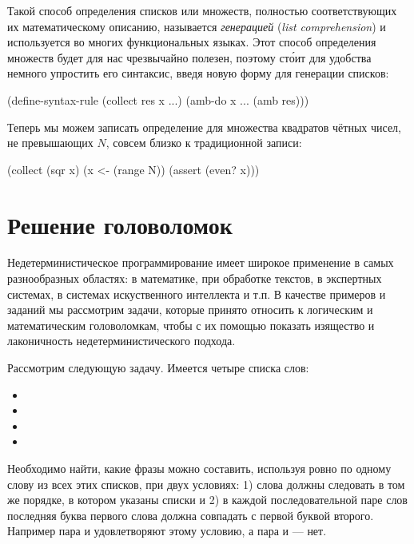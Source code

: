 Такой способ определения списков или множеств, полностью соответствующих их математическому описанию, называется \emph{генерацией} (\emph{list comprehension}) и используется во многих функциональных языках. Этот способ определения множеств будет для нас чрезвычайно полезен, поэтому ст\'{о}ит для удобства немного упростить его синтаксис, введя новую форму  для генерации списков:

\begin{Definition}[emph={x,res}]
(define-syntax-rule (collect res x ...)
  (amb-do x ... (amb res)))
\end{Definition}
Теперь мы можем записать определение для множества квадратов чётных чисел, не превышающих $N$, совсем близко к традиционной записи:
\begin{SchemeCode}[emph={x,N}]
  (collect (sqr x) (x <- (range N)) (assert (even? x)))
\end{SchemeCode}

\section{Решение головоломок}%
Недетерминистическое программирование имеет широкое применение в самых разнообразных областях: в математике, при обработке текстов, в экспертных системах, в системах искуственного интеллекта и т.п. В качестве примеров и заданий мы рассмотрим задачи, которые принято относить к логическим и математическим головоломкам, чтобы с их помощью показать изящество и лаконичность недетерминистического подхода.

Рассмотрим следующую задачу. Имеется четыре списка слов:

\begin{itemize}
  \item {}
  \item {}
  \item {}
  \item {}
\end{itemize}

Необходимо найти, какие фразы можно составить, используя ровно по одному слову из всех этих списков, при двух условиях: 1) слова должны следовать в том же порядке, в котором указаны списки и 2) в каждой последовательной паре слов последняя буква первого слова должна совпадать с первой буквой второго. Например пара  и  удовлетворяют этому условию, а пара  и  --- нет. 

